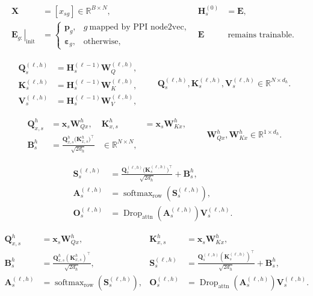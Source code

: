 \documentclass[12pt]{article}
\begin{document}
\[
\begin{aligned}
\bm X&=[x_{sg}]\in\mathbb R^{B\times N},
&\bm H_s^{(0)}&=\bm E,\\[-1mm]
\left.\bm E_{g:}\right|_{\mathrm{init}}
&=
\begin{cases}
\bm p_g, & g\ \text{mapped by PPI node2vec},\\
\bm\varepsilon_g, & \text{otherwise},
\end{cases}
&\bm E&\ \text{remains trainable.}
\end{aligned}
\]

\newpage

\[
\begin{aligned}
\bm Q_s^{(\ell,h)}&=\bm H_s^{(\ell-1)}\bm W_Q^{(\ell,h)},\\
\bm K_s^{(\ell,h)}&=\bm H_s^{(\ell-1)}\bm W_K^{(\ell,h)},\\
\bm V_s^{(\ell,h)}&=\bm H_s^{(\ell-1)}\bm W_V^{(\ell,h)},
\end{aligned}
\qquad
\bm Q_s^{(\ell,h)},\bm K_s^{(\ell,h)},\bm V_s^{(\ell,h)}
\in\mathbb R^{N\times d_h}.
\]

\newpage

\[
\begin{aligned}
\bm Q_{x,s}^{h}&=\bm x_s\bm W_{Qx}^{h},
&\bm K_{x,s}^{h}&=\bm x_s\bm W_{Kx}^{h},\\[1mm]
\bm B_s^{h}
&=\frac{\bm Q_{x,s}^{h}\bigl(\bm K_{x,s}^{h}\bigr)^{\!\top}}
{\sqrt{2d_h}}
&\in\mathbb R^{N\times N},
\end{aligned}
\qquad
\bm W_{Qx}^{h},\bm W_{Kx}^{h}\in\mathbb R^{1\times d_h}.
\]

\newpage

\[
\begin{aligned}
\bm S_s^{(\ell,h)}
&=\frac{\bm Q_s^{(\ell,h)}\bigl(\bm K_s^{(\ell,h)}\bigr)^{\!\top}}
{\sqrt{2d_h}}+\bm B_s^h,\\[1mm]
\bm A_s^{(\ell,h)}
&=\operatorname{softmax}_{\mathrm{row}}\!\left(\bm S_s^{(\ell,h)}\right),\\[1mm]
\bm O_s^{(\ell,h)}
&=\operatorname{Drop}_{\mathrm{attn}}\!\left(\bm A_s^{(\ell,h)}\right)
\bm V_s^{(\ell,h)}.
\end{aligned}
\]

\newpage

\[
\boxed{
\begin{aligned}
\bm Q_{x,s}^{h}&=\bm x_s\bm W_{Qx}^{h},
&\bm K_{x,s}^{h}&=\bm x_s\bm W_{Kx}^{h},\\[-1mm]
\bm B_s^{h}
&=\frac{\bm Q_{x,s}^{h}(\bm K_{x,s}^{h})^{\!\top}}{\sqrt{2d_h}},
&\bm S_s^{(\ell,h)}
&=\frac{\bm Q_s^{(\ell,h)}(\bm K_s^{(\ell,h)})^{\!\top}}{\sqrt{2d_h}}+\bm B_s^h,\\[-1mm]
\bm A_s^{(\ell,h)}
&=\operatorname{softmax}_{\mathrm{row}}\!\left(\bm S_s^{(\ell,h)}\right),
&\bm O_s^{(\ell,h)}
&=\operatorname{Drop}_{\mathrm{attn}}\!\left(\bm A_s^{(\ell,h)}\right)\bm V_s^{(\ell,h)}.
\end{aligned}}
\]
\end{document}
